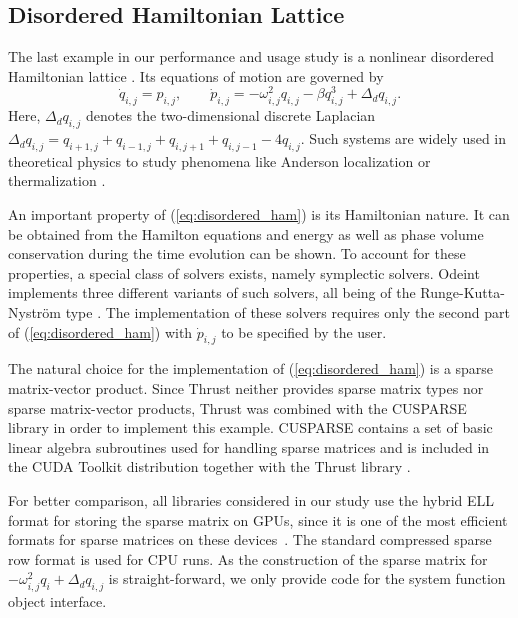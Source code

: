 \documentclass[final]{siamltex}
\newcommand{\eqref}[1]{(\ref{#1})}
\begin{document}
%
%
\subsection{Disordered Hamiltonian Lattice}


The last example in our performance and usage study is a
nonlinear disordered Hamiltonian lattice \cite{mulansky_scaling_2012}. Its
equations of motion are governed by
\begin{equation}
\dot{q}_{i,j} = p_{i,j}, \quad \quad
\dot{p}_{i,j} = - \omega_{i,j}^2 q_{i,j} - \beta q_{i,j}^3 + \Delta_d q_{i,j}.
\label{eq:disordered_ham}
\end{equation}
Here, $\Delta_d q_{i,j}$ denotes the two-dimensional discrete Laplacian
$\Delta_d
q_{i,j}=q_{i+1,j}+q_{i-1,j}+q_{i,j+1}+q_{i,j-1}-4q_{i,j}$. Such
systems are widely used in theoretical physics to study phenomena
like Anderson localization \cite{Sheng-06} or thermalization \cite{FPUScholarpedia}.

An important property of \eqref{eq:disordered_ham} is its Hamiltonian
nature. It can be obtained from the Hamilton equations and energy as well as phase volume conservation during the time
evolution can be shown. To account for these properties, a special class of solvers
exists, namely symplectic solvers. Odeint implements three different
variants of such solvers, all being of the Runge-Kutta-Nystr\"om
type \cite{HairerGeometricNumericalIntegration2006,Leimkuhler-Reich-04}. The
implementation of these solvers requires only the second part
of \eqref{eq:disordered_ham} with $\dot{p}_{i,j}$ to be specified by
the user.



The natural choice for the implementation of \eqref{eq:disordered_ham} is a
sparse matrix-vector product. Since Thrust neither provides sparse matrix
types nor sparse matrix-vector products, Thrust was combined with the
CUSPARSE library in order to implement this example. CUSPARSE contains a set of
basic linear algebra subroutines used for handling sparse matrices and is
included in the CUDA Toolkit distribution together with the Thrust library
\cite{NvidiaCusparseManual}.

For better comparison, all libraries considered in our study use the hybrid ELL
format for storing the sparse matrix on GPUs, since it is one of the most
efficient formats for sparse matrices on these devices~\cite{BellGarland2008}.
The standard compressed sparse row format is used for CPU runs.  As the
construction of the sparse matrix for $- \omega_{i,j}^2 q_i + \Delta_d q_{i,j}$
is straight-forward, we only provide code for the system function object
interface.
\end{document}
